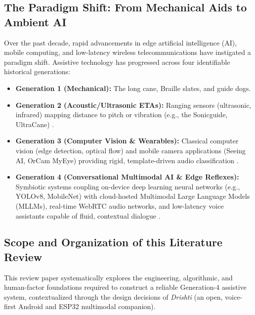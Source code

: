 \documentclass[10pt,twocolumn]{article}
\begin{document}
\subsection{The Paradigm Shift: From Mechanical Aids to Ambient AI}
Over the past decade, rapid advancements in edge artificial intelligence (AI), mobile computing, and low-latency wireless telecommunications have instigated a paradigm shift. Assistive technology has progressed across four identifiable historical generations:
\begin{itemize}[leftmargin=*]
    \item \textbf{Generation 1 (Mechanical):} The long cane, Braille slates, and guide dogs.
    \item \textbf{Generation 2 (Acoustic/Ultrasonic ETAs):} Ranging sensors (ultrasonic, infrared) mapping distance to pitch or vibration (e.g., the Sonicguide, UltraCane) \cite{kay1974ultrasonic}.
    \item \textbf{Generation 3 (Computer Vision & Wearables):} Classical computer vision (edge detection, optical flow) and mobile camera applications (Seeing AI, OrCam MyEye) providing rigid, template-driven audio classification \cite{manduchi2014mobile, orcam2020}.
    \item \textbf{Generation 4 (Conversational Multimodal AI & Edge Reflexes):} Symbiotic systems coupling on-device deep learning neural networks (e.g., YOLOv8, MobileNet) with cloud-hosted Multimodal Large Language Models (MLLMs), real-time WebRTC audio networks, and low-latency voice assistants capable of fluid, contextual dialogue \cite{achiam2023gpt4, team2024gemini}.
\end{itemize}

\subsection{Scope and Organization of this Literature Review}
This review paper systematically explores the engineering, algorithmic, and human-factor foundations required to construct a reliable Generation-4 assistive system, contextualized through the design decisions of \textit{Drishti} (an open, voice-first Android and ESP32 multimodal companion). 
\end{document}
